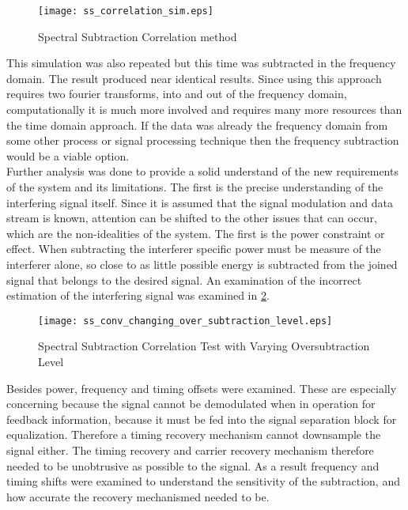 \begin{figure}[!ht]\label{ss_correlation}
\centering
\texttt{[image: ss\_correlation\_sim.eps]}
\caption{Spectral Subtraction Correlation method}
\end{figure} 

This simulation was also repeated but this time was subtracted in the frequency domain.  The result produced near identical results.  Since using this approach requires two fourier transforms, into and out of the frequency domain, computationally it is much more involved and requires many more resources than the time domain approach.  If the data was already the frequency domain from some other process or signal processing technique then the frequency subtraction would be a viable option.\\

Further analysis was done to provide a solid understand of the new requirements of the system and its limitations.  The first is the precise understanding of the interfering signal itself.  Since it is assumed that the signal modulation and data stream is known, attention can be shifted to the other issues that can occur, which are the non-idealities of the system.  The first is the power constraint or effect.  When subtracting the interferer specific power must be measure of the interferer alone, so close to as little possible energy is subtracted from the joined signal that belongs to the desired signal.  An examination of the incorrect estimation of the interfering signal was examined in \ref{power_delta}.

\begin{figure}[!ht]\label{power_delta}  
\centering
\texttt{[image: ss\_conv\_changing\_over\_subtraction\_level.eps]}
\caption{Spectral Subtraction Correlation Test with Varying Oversubtraction Level}
\end{figure}

Besides power, frequency and timing offsets were examined.  These are especially concerning because the signal cannot be demodulated when in operation for feedback information, because it must be fed into the signal separation block for equalization.  Therefore a timing recovery mechanism cannot downsample the signal either.  The timing recovery and carrier recovery mechanism therefore needed to be unobtrusive as possible to the signal.  As a result frequency and timing shifts were examined to understand the sensitivity of the subtraction, and how accurate the recovery mechanismed needed to be.

